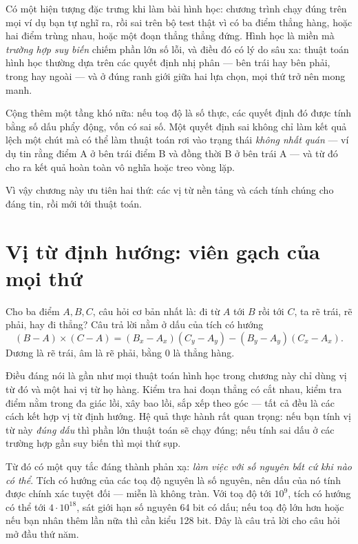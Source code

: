 \documentclass[../../algorithm.tex]{subfiles}
\begin{document}
Có một hiện tượng đặc trưng khi làm bài hình học: chương trình chạy đúng trên mọi ví dụ bạn tự nghĩ ra, rồi sai trên bộ test thật vì có ba điểm thẳng hàng, hoặc hai điểm trùng nhau, hoặc một đoạn thẳng thẳng đứng. Hình học là miền mà \emph{trường hợp suy biến} chiếm phần lớn số lỗi, và điều đó có lý do sâu xa: thuật toán hình học thường dựa trên các quyết định nhị phân --- bên trái hay bên phải, trong hay ngoài --- và ở đúng ranh giới giữa hai lựa chọn, mọi thứ trở nên mong manh.

Cộng thêm một tầng khó nữa: nếu toạ độ là số thực, các quyết định đó được tính bằng số dấu phẩy động, vốn có sai số. Một quyết định sai không chỉ làm kết quả lệch một chút mà có thể làm thuật toán rơi vào trạng thái \emph{không nhất quán} --- ví dụ tin rằng điểm A ở bên trái điểm B và đồng thời B ở bên trái A --- và từ đó cho ra kết quả hoàn toàn vô nghĩa hoặc treo vòng lặp.

Vì vậy chương này ưu tiên hai thứ: các vị từ nền tảng và cách tính chúng cho đáng tin, rồi mới tới thuật toán.

\section{Vị từ định hướng: viên gạch của mọi thứ}

Cho ba điểm \(A, B, C\), câu hỏi cơ bản nhất là: đi từ \(A\) tới \(B\) rồi tới \(C\), ta rẽ trái, rẽ phải, hay đi thẳng? Câu trả lời nằm ở dấu của tích có hướng
\[
(B-A) \times (C-A) = (B_x - A_x)(C_y - A_y) - (B_y - A_y)(C_x - A_x).
\]
Dương là rẽ trái, âm là rẽ phải, bằng 0 là thẳng hàng.

Điều đáng nói là gần như mọi thuật toán hình học trong chương này chỉ dùng vị từ đó và một hai vị từ họ hàng. Kiểm tra hai đoạn thẳng có cắt nhau, kiểm tra điểm nằm trong đa giác lồi, xây bao lồi, sắp xếp theo góc --- tất cả đều là các cách kết hợp vị từ định hướng. Hệ quả thực hành rất quan trọng: nếu bạn tính vị từ này \emph{đúng dấu} thì phần lớn thuật toán sẽ chạy đúng; nếu tính sai dấu ở các trường hợp gần suy biến thì mọi thứ sụp.

Từ đó có một quy tắc đáng thành phản xạ: \emph{làm việc với số nguyên bất cứ khi nào có thể}. Tích có hướng của các toạ độ nguyên là số nguyên, nên dấu của nó tính được chính xác tuyệt đối --- miễn là không tràn. Với toạ độ tới \(10^9\), tích có hướng có thể tới \(4\cdot10^{18}\), sát giới hạn số nguyên 64 bit có dấu; nếu toạ độ lớn hơn hoặc nếu bạn nhân thêm lần nữa thì cần kiểu 128 bit. Đây là câu trả lời cho câu hỏi mở đầu thứ năm.
\end{document}
